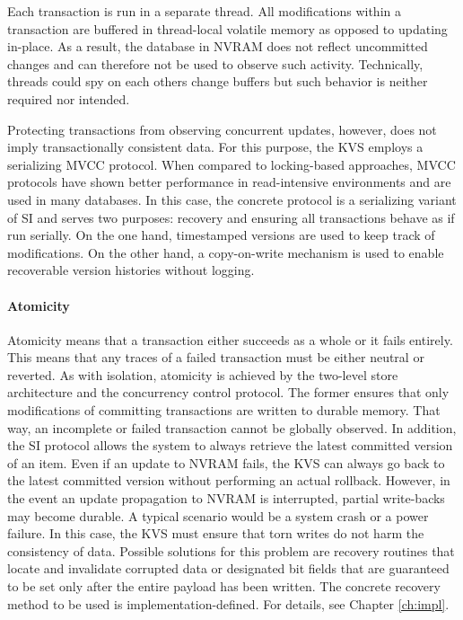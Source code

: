 Each transaction is run in a separate thread. All modifications within a
transaction are buffered in thread-local volatile memory as opposed to updating
in-place. As a result, the database in \ac{NVRAM} does not reflect uncommitted
changes and can therefore not be used to observe such activity. Technically,
threads could spy on each others change buffers but such behavior is neither
required nor intended.

Protecting transactions from observing concurrent updates, however, does not
imply transactionally consistent data. For this purpose, the \ac{KVS} employs a
serializing \ac{MVCC} protocol. When compared to locking-based approaches,
\ac{MVCC} protocols have shown better performance in read-intensive environments
and are used in many databases. In this case, the concrete protocol is a
serializing variant of \ac{SI} and serves two purposes: recovery and ensuring
all transactions behave as if run serially. On the one hand, timestamped
versions are used to keep track of modifications. On the other hand, a
copy-on-write mechanism is used to enable recoverable version histories without
logging.

\paragraph{Atomicity}

Atomicity means that a transaction either succeeds as a whole or it fails
entirely. This means that any traces of a failed transaction must be either
neutral or reverted. As with isolation, atomicity is achieved by the two-level
store architecture and the concurrency control protocol. The former ensures that
only modifications of committing transactions are written to durable memory.
That way, an incomplete or failed transaction cannot be globally observed. In
addition, the \ac{SI} protocol allows the system to always retrieve the latest
committed version of an item. Even if an update to \ac{NVRAM} fails, the
\ac{KVS} can always go back to the latest committed version without performing
an actual rollback. However, in the event an update propagation to \ac{NVRAM} is
interrupted, partial write-backs may become durable. A typical scenario would be
a system crash or a power failure. In this case, the \ac{KVS} must ensure that
torn writes do not harm the consistency of data. Possible solutions for this
problem are recovery routines that locate and invalidate corrupted data or
designated bit fields that are guaranteed to be set only after the entire payload
has been written. The concrete recovery method to be used is
implementation-defined. For details, see Chapter \ref{ch:impl}.

